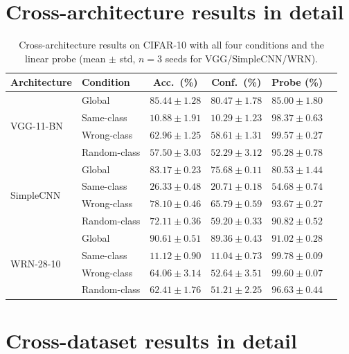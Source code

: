 \documentclass{article}
\begin{document}
\section{Cross-architecture results in detail}
\label{app:cross_arch}

\begin{table}[h]
\caption{Cross-architecture results on CIFAR-10 with all four conditions and the linear probe (mean $\pm$ std, $n{=}3$ seeds for VGG/SimpleCNN/WRN).}
\label{tab:cross_arch_full}
\centering
\small
\begin{tabular}{@{}llcccc@{}}
\toprule
Architecture & Condition & Acc.\ (\%) & Conf.\ (\%) & Probe (\%) \\
\midrule
\multirow{4}{*}{VGG-11-BN}
  & Global       & $85.44 \pm 1.28$ & $80.47 \pm 1.78$ & $85.00 \pm 1.80$ \\
  & Same-class   & $10.88 \pm 1.91$ & $10.29 \pm 1.23$ & $98.37 \pm 0.63$ \\
  & Wrong-class  & $62.96 \pm 1.25$ & $58.61 \pm 1.31$ & $99.57 \pm 0.27$ \\
  & Random-class & $57.50 \pm 3.03$ & $52.29 \pm 3.12$ & $95.28 \pm 0.78$ \\
\midrule
\multirow{4}{*}{SimpleCNN}
  & Global       & $83.17 \pm 0.23$ & $75.68 \pm 0.11$ & $80.53 \pm 1.44$ \\
  & Same-class   & $26.33 \pm 0.48$ & $20.71 \pm 0.18$ & $54.68 \pm 0.74$ \\
  & Wrong-class  & $78.10 \pm 0.46$ & $65.79 \pm 0.59$ & $93.67 \pm 0.27$ \\
  & Random-class & $72.11 \pm 0.36$ & $59.20 \pm 0.33$ & $90.82 \pm 0.52$ \\
\midrule
\multirow{4}{*}{WRN-28-10}
  & Global       & $90.61 \pm 0.51$ & $89.36 \pm 0.43$ & $91.02 \pm 0.28$ \\
  & Same-class   & $11.12 \pm 0.90$ & $11.04 \pm 0.73$ & $99.78 \pm 0.09$ \\
  & Wrong-class  & $64.06 \pm 3.14$ & $52.64 \pm 3.51$ & $99.60 \pm 0.07$ \\
  & Random-class & $62.41 \pm 1.76$ & $51.21 \pm 2.25$ & $96.63 \pm 0.44$ \\
\bottomrule
\end{tabular}
\end{table}

\section{Cross-dataset results in detail}
\label{app:cross_data}
\end{document}
